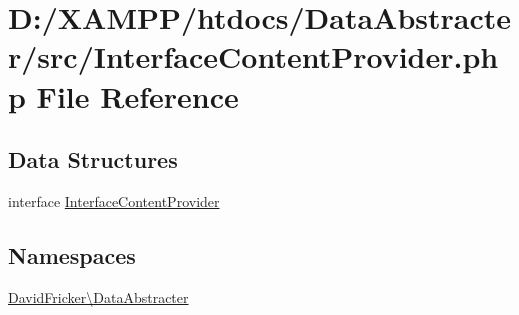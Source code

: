 \hypertarget{_interface_content_provider_8php}{}\section{D\+:/\+X\+A\+M\+P\+P/htdocs/\+Data\+Abstracter/src/\+Interface\+Content\+Provider.php File Reference}
\label{_interface_content_provider_8php}
\subsection*{Data Structures}
\begin{DoxyCompactItemize}
\item 
interface \hyperlink{interface_david_fricker_1_1_data_abstracter_1_1_interface_content_provider}{Interface\+Content\+Provider}
\end{DoxyCompactItemize}
\subsection*{Namespaces}
\begin{DoxyCompactItemize}
\item 
 \hyperlink{namespace_david_fricker_1_1_data_abstracter}{David\+Fricker\textbackslash{}\+Data\+Abstracter}
\end{DoxyCompactItemize}
